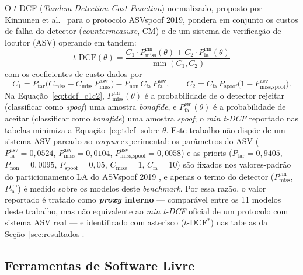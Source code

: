 \documentclass[12pt,a4paper]{article}
\begin{document}
O $t$-DCF (\textit{Tandem Detection Cost Function}) normalizado, proposto por
Kinnunen et al.\ \cite{kinnunen2018tdcf} para o protocolo ASVspoof 2019, pondera
em conjunto os custos de falha do detector (\textit{countermeasure}, CM) e de
um sistema de verificação de locutor (ASV) operando em tandem:
\begin{equation}
\label{eq:tdcf}
t\text{-DCF}(\theta) = \frac{C_1 \cdot P_{\text{miss}}^{\text{cm}}(\theta) +
C_2 \cdot P_{\text{fa}}^{\text{cm}}(\theta)}{\min(C_1, C_2)}
\end{equation}
\noindent
com os coeficientes de custo dados por
\begin{equation}
\label{eq:tdcf_c1c2}
C_1 = P_{\text{tar}}\big(C_{\text{miss}} - C_{\text{miss}}\, P_{\text{miss}}^{\text{asv}}\big)
      - P_{\text{non}}\, C_{\text{fa}}\, P_{\text{fa}}^{\text{asv}}, \qquad
C_2 = C_{\text{fa}}\, P_{\text{spoof}}\big(1 - P_{\text{miss,spoof}}^{\text{asv}}\big).
\end{equation}
\noindent
Na Equação~\ref{eq:tdcf_c1c2}, $P_{\text{miss}}^{\text{cm}}(\theta)$ é a
probabilidade de o detector rejeitar (classificar como \textit{spoof}) uma
amostra \textit{bonafide}, e
$P_{\text{fa}}^{\text{cm}}(\theta)$ é a probabilidade de aceitar (classificar
como \textit{bonafide}) uma amostra \textit{spoof}; o \textit{min t-DCF}
reportado nas tabelas minimiza a Equação~\ref{eq:tdcf} sobre $\theta$. Este
trabalho não dispõe de um sistema ASV pareado ao \textit{corpus} experimental:
os parâmetros do ASV ($P_{\text{fa}}^{\text{asv}}=0{,}0524$,
$P_{\text{miss}}^{\text{asv}}=0{,}0104$,
$P_{\text{miss,spoof}}^{\text{asv}}=0{,}0058$) e as prioris
($P_{\text{tar}}=0{,}9405$, $P_{\text{non}}=0{,}0095$, $P_{\text{spoof}}=0{,}05$,
$C_{\text{miss}}=1$, $C_{\text{fa}}=10$) são fixados nos valores-padrão do
particionamento LA do ASVspoof 2019 \cite{kinnunen2018tdcf}, e apenas o termo do
detector ($P_{\text{miss}}^{\text{cm}}$, $P_{\text{fa}}^{\text{cm}}$) é medido
sobre os modelos deste \textit{benchmark}. Por essa razão, o valor reportado é
tratado como \textbf{\textit{proxy} interno} --- comparável entre os
\num{11} modelos deste trabalho, mas não equivalente ao \textit{min t-DCF}
oficial de um protocolo com sistema ASV real --- e identificado com asterisco
($t$-DCF$^\ast$) nas tabelas da Seção~\ref{sec:resultados}.

\subsection{Ferramentas de Software Livre}
\label{sec:software}
\end{document}
